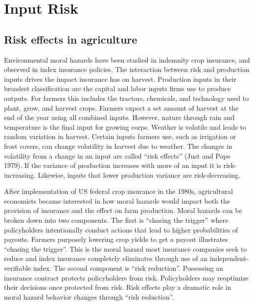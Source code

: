 \documentclass[
  letterpaper,
  DIV=11,
  numbers=noendperiod]{scrartcl}
\theoremstyle{plain}
\theoremstyle{plain}
\theoremstyle{remark}
\begin{document}
\hypertarget{sec-risk}{%
\section{Input Risk}\label{sec-risk}}

\hypertarget{risk-effects-in-agriculture}{%
\subsection{Risk effects in
agriculture}\label{risk-effects-in-agriculture}}

Environmental moral hazards have been studied in indemnity crop
insurance, and observed in index insurance policies. The interaction
between risk and production inputs drives the impact insurance has on
harvest. Production inputs in their broadest classification are the
capital and labor inputs firms use to produce outputs. For farmers this
includes the tractors, chemicals, and technology used to plant, grow,
and harvest crops. Farmers expect a set amount of harvest at the end of
the year using all combined inputs. However, nature through rain and
temperature is the final input for growing corps. Weather is volatile
and leads to random variation in harvest. Certain inputs farmers use,
such as irrigation or frost covers, can change volatility in harvest due
to weather. The changes in volatility from a change in an input are
called ``risk effects'' (Just and Pope 1979). If the variance of
production increases with more of an input it is risk-increasing.
Likewise, inputs that lower production variance are risk-decreasing.

After implementation of US federal crop insurance in the 1980s,
agricultural economists became interested in how moral hazards would
impact both the provision of insurance and the effect on farm
production. Moral hazards can be broken down into two components. The
first is ``chasing the trigger'' where policyholders intentionally
conduct actions that lead to higher probabilities of payouts. Farmers
purposely lowering crop yields to get a payout illustrates ``chasing the
trigger''. This is the moral hazard most insurance companies seek to
reduce and index insurance completely eliminates through use of an
independent-verifiable index. The second component is ``risk
reduction''. Possessing an insurance contract protects policyholders
from risk. Policyholders may reoptimize their decisions once protected
from risk. Risk effects play a dramatic role in moral hazard behavior
changes through ``risk reduction''.
\end{document}
